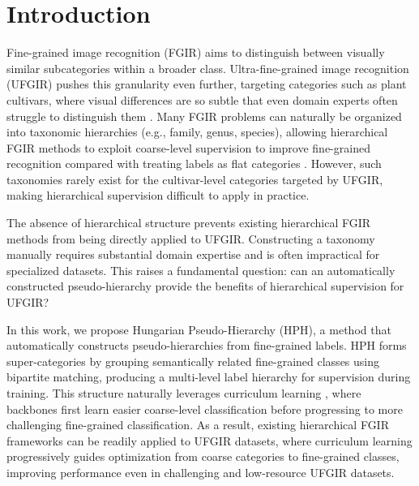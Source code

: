 \documentclass[conference,a4paper]{IEEEtran}
\begin{document}
\section{Introduction}
Fine-grained image recognition (FGIR) aims to distinguish between visually similar subcategories within a broader class. Ultra-fine-grained image recognition (UFGIR) pushes this granularity even further, targeting categories such as plant cultivars, where visual differences are so subtle that even domain experts often struggle to distinguish them \cite{yu_benchmark_2021}. Many FGIR problems can naturally be organized into taxonomic hierarchies (e.g., family, genus, species), allowing hierarchical FGIR methods to exploit coarse-level supervision to improve fine-grained recognition compared with treating labels as flat categories \cite{zhang_part-based_2014, zheng_learning_2017, chen_fine-grained_2018, chang_your_2021}. However, such taxonomies rarely exist for the cultivar-level categories targeted by UFGIR, making hierarchical supervision difficult to apply in practice.

The absence of hierarchical structure prevents existing hierarchical FGIR methods from being directly applied to UFGIR. Constructing a taxonomy manually requires substantial domain expertise and is often impractical for specialized datasets. This raises a fundamental question: can an automatically constructed pseudo-hierarchy provide the benefits of hierarchical supervision for UFGIR?

In this work, we propose Hungarian Pseudo-Hierarchy (HPH), a method that automatically constructs pseudo-hierarchies from fine-grained labels. HPH forms super-categories by grouping semantically related fine-grained classes using bipartite matching, producing a multi-level label hierarchy for supervision during training. This structure naturally leverages curriculum learning \cite{bengio_curriculum_2009}, where backbones first learn easier coarse-level classification before progressing to more challenging fine-grained classification. As a result, existing hierarchical FGIR frameworks can be readily applied to UFGIR datasets, where curriculum learning progressively guides optimization from coarse categories to fine-grained classes, improving performance even in challenging and low-resource UFGIR datasets.
\end{document}

